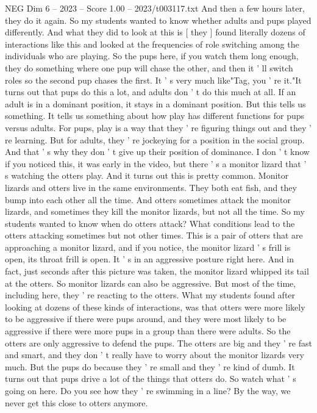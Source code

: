 \begin{textsample}{NEG Dim 6 – 2023 – Score 1.00 – 2023/t003117.txt}
And then a few hours later, they do it again.
So my students wanted to know whether adults and pups played differently.
And what they did to look at this is [ they ] found literally dozens of interactions like this and looked at the frequencies of role switching among the individuals who are playing.
So the pups here, if you watch them long enough, they do something where one pup will chase the other, and then it ' ll switch roles so the second pup chases the first.
It ' s very much like"Tag, you ' re it."It turns out that pups do this a lot, and adults don ' t do this much at all.
If an adult is in a dominant position, it stays in a dominant position.
But this tells us something.
It tells us something about how play has different functions for pups versus adults.
For pups, play is a way that they ' re figuring things out and they ' re learning.
But for adults, they ' re jockeying for a position in the social group.
And that ' s why they don ' t give up their position of dominance.
I don ' t know if you noticed this, it was early in the video, but there ' s a monitor lizard that ' s watching the otters play.
And it turns out this is pretty common.
Monitor lizards and otters live in the same environments.
They both eat fish, and they bump into each other all the time.
And otters sometimes attack the monitor lizards, and sometimes they kill the monitor lizards, but not all the time.
So my students wanted to know when do otters attack?
What conditions lead to the otters attacking sometimes but not other times.
This is a pair of otters that are approaching a monitor lizard, and if you notice, the monitor lizard ' s frill is open, its throat frill is open.
It ' s in an aggressive posture right here.
And in fact, just seconds after this picture was taken, the monitor lizard whipped its tail at the otters.
So monitor lizards can also be aggressive.
But most of the time, including here, they ' re reacting to the otters.
What my students found after looking at dozens of these kinds of interactions, was that otters were more likely to be aggressive if there were pups around, and they were most likely to be aggressive if there were more pups in a group than there were adults.
So the otters are only aggressive to defend the pups.
The otters are big and they ' re fast and smart, and they don ' t really have to worry about the monitor lizards very much.
But the pups do because they ' re small and they ' re kind of dumb.
It turns out that pups drive a lot of the things that otters do.
So watch what ' s going on here.
Do you see how they ' re swimming in a line?
By the way, we never get this close to otters anymore.

\end{textsample}
